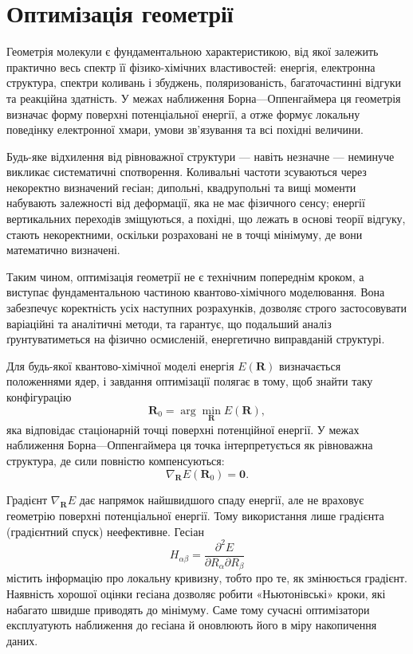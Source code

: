 
\section{Оптимізація геометрії}\label{sec:GeometryOptimization}

Геометрія молекули є фундаментальною характеристикою, від якої залежить практично весь спектр її фізико-хімічних властивостей: енергія, електронна структура, спектри коливань і збуджень, поляризованість, багаточастинні відгуки та реакційна здатність. У межах наближення Борна---Оппенгаймера ця геометрія визначає форму поверхні потенціальної енергії, а отже формує локальну поведінку електронної хмари, умови зв'язування та всі похідні величини.

Будь-яке відхилення від рівноважної структури --- навіть незначне --- неминуче викликає систематичні спотворення. Коливальні частоти зсуваються через некоректно визначений гесіан; дипольні, квадрупольні та вищі моменти набувають залежності від деформації, яка не має фізичного сенсу; енергії вертикальних переходів зміщуються, а похідні, що лежать в основі теорії відгуку, стають некоректними, оскільки розраховані не в точці мінімуму, де вони математично визначені.

Таким чином, оптимізація геометрії не є технічним попереднім кроком, а виступає фундаментальною частиною квантово-хімічного моделювання. Вона забезпечує коректність усіх наступних розрахунків, дозволяє строго застосовувати варіаційні та аналітичні методи, та гарантує, що подальший аналіз ґрунтуватиметься на фізично осмисленій, енергетично виправданій структурі.




Для будь-якої квантово-хімічної моделі енергія $E(\mathbf R)$ визначається положеннями ядер, і завдання оптимізації полягає в тому, щоб знайти таку конфігурацію
\[
\mathbf R_0 = \arg\min_{\mathbf R} E(\mathbf R),
\]
яка відповідає стаціонарній точці поверхні потенційної енергії. У межах наближення Борна---Оппенгаймера ця точка інтерпретується як рівноважна структура, де сили повністю компенсуються:
\[
\nabla_{\mathbf R} E(\mathbf R_0) = \mathbf 0.
\]

Градієнт $\nabla_{\mathbf R} E$ дає напрямок найшвидшого спаду енергії, але не враховує геометрію поверхні потенціальної енергії. Тому використання лише градієнта (градієнтний спуск) неефективне. Гесіан
\[
H_{\alpha\beta}=\frac{\partial^2E}{\partial R_\alpha\partial R_\beta}
\]
містить інформацію про локальну кривизну, тобто про те, як змінюється градієнт. Наявність хорошої оцінки гесіана дозволяє робити «Ньютонівські» кроки, які набагато швидше приводять до мінімуму. Саме тому сучасні оптимізатори експлуатують наближення до гесіана й оновлюють його в міру накопичення даних.

